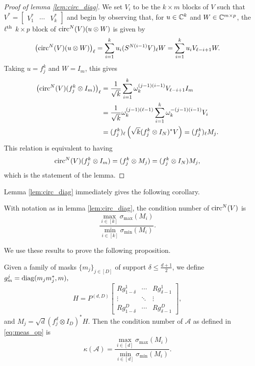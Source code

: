 \begin{proof}[Proof of lemma \ref{lem:circ_diag}]
  We set $V_i$ to be the $k \times m$ blocks of $V$ such that $V^* = \begin{bmatrix} V_1^* & \cdots & V_k^* \end{bmatrix}$ and begin by observing that, for $u \in \mathbb{C}^k$ and $W \in \mathbb{C}^{m \times p}$, the $\ell^{\text{th}}$ $k \times p$ block of $\operatorname{circ}^N(V)(u \otimes W)$ is given by \[\left(\operatorname{circ}^N(V)(u \otimes W)\right)_\ell = \sum_{i = 1}^k u_i (S^{N (i - 1)}V)_\ell W = \sum_{i = 1}^k u_i V_{\ell - i + 1} W.\]  Taking $u = f_j^k$ and $W = I_m$, this gives \begin{align*} \left(\operatorname{circ}^N(V)(f_j^k \otimes I_m)\right)_\ell &= \frac{1}{\sqrt{k}}\sum_{i = 1}^k \omega_k^{(j - 1) (i - 1)} V_{\ell - i + 1} I_m \\ &= \frac{1}{\sqrt{k}} \omega_k^{(j - 1) (\ell - 1)} \sum_{i = 1}^k \omega_k^{-(j - 1)(i - 1)} V_i \\ &= (f_j^k)_\ell \left(\sqrt{k} (f_j^k \otimes I_N)^* V \right) = (f_j^k)_\ell M_j. \end{align*}  This relation is equivalent to having \[\operatorname{circ}^N(V) (f_j^k \otimes I_m) = (f_j^k \otimes M_j) = (f_j^k \otimes I_N) M_j,\] which is the statement of the lemma.
\end{proof}

Lemma \ref{lem:circ_diag} immediately gives the following corollary.

\begin{corollary}
  With notation as in lemma \ref{lem:circ_diag}, the condition number of $\operatorname{circ}^N(V)$ is \[\dfrac{\max\limits_{i \in [k]} \sigma_{\max} (M_i)}{\min\limits_{i \in [k]} \sigma_{\min} (M_i)}.\] \label{cor:circ_diag_condition}
\end{corollary}

We use these results to prove the following proposition.

\begin{proposition}
  Given a family of masks $\{m_j\}_{j \in [D]}$ of support $\delta \le \frac{d + 1}{2}$, we define $g_m^j = \operatorname{diag}(m_j m_j^*, m),$ \[H = P^{(d, D)} \begin{bmatrix} R g_{1 - \delta}^1 & \cdots & R g_{\delta - 1}^1 \\ \vdots & \ddots & \vdots \\ R g_{1 - \delta}^D & \cdots & R g_{\delta - 1}^D \end{bmatrix},\] and $M_j = \sqrt{d}\left(f_j^d \otimes I_D\right)^* H$.  Then the condition number of $\mathcal{A}$ as defined in \eqref{eq:meas_op} is \[\kappa(\mathcal{A}) = \dfrac{\max\limits_{i \in [d]} \sigma_{\max} (M_i)}{\min\limits_{i \in [d]} \sigma_{\min} (M_i)}.\] \label{prop:meas_cond}
\end{proposition}

